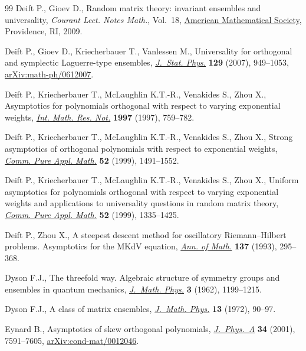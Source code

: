 \documentclass[pdftex]{sigma}
\numberwithin{equation}{section}
\begin{document}
\begin{thebibliography}{99}
Deift P., Gioev D., Random matrix theory: invariant ensembles and universality,
 \textit{Courant Lect. Notes Math.}, Vol.~18, \href{https://doi.org/10.1090/cln/018}{American Mathematical Society},
 Providence, RI, 2009.

Deift P., Gioev D., Kriecherbauer T., Vanlessen M., Universality for orthogonal
 and symplectic {L}aguerre-type ensembles, \href{https://doi.org/10.1007/s10955-007-9325-x}{\textit{J.~Stat. Phys.}}
 \textbf{129} (2007), 949--1053, \href{https://arxiv.org/abs/math-ph/0612007}{arXiv:math-ph/0612007}.

Deift P., Kriecherbauer T., McLaughlin K.T.-R., Venakides S., Zhou X.,
 Asymptotics for polynomials orthogonal with respect to varying exponential
 weights, \href{https://doi.org/10.1155/S1073792897000500}{\textit{Int. Math. Res. Not.}} \textbf{1997} (1997), 759--782.

Deift P., Kriecherbauer T., McLaughlin K.T.-R., Venakides S., Zhou X., Strong
 asymptotics of orthogonal polynomials with respect to exponential weights,
 \href{https://doi.org/10.1002/(SICI)1097-0312(199912)52:12<1491::AID-CPA2>3.3.CO;2-R}{\textit{Comm. Pure Appl. Math.}} \textbf{52} (1999), 1491--1552.

Deift P., Kriecherbauer T., McLaughlin K.T.-R., Venakides S., Zhou X., Uniform
 asymptotics for polynomials orthogonal with respect to varying exponential
 weights and applications to universality questions in random matrix theory,
 \href{https://doi.org/10.1002/(SICI)1097-0312(199911)52:11<1335::AID-CPA1>3.0.CO;2-1}{\textit{Comm. Pure Appl. Math.}} \textbf{52} (1999), 1335--1425.

Deift P., Zhou X., A steepest descent method for oscillatory
 {R}iemann--{H}ilbert problems. {A}symptotics for the {MK}d{V} equation,
 \href{https://doi.org/10.2307/2946540}{\textit{Ann. of Math.}} \textbf{137} (1993), 295--368.

Dyson F.J., The threefold way. {A}lgebraic structure of symmetry groups and
 ensembles in quantum mechanics, \href{https://doi.org/10.1063/1.1703863}{\textit{J.~Math. Phys.}} \textbf{3} (1962),
 1199--1215.

Dyson F.J., A class of matrix ensembles, \href{https://doi.org/10.1063/1.1665857}{\textit{J.~Math. Phys.}} \textbf{13}
 (1972), 90--97.

Eynard B., Asymptotics of skew orthogonal polynomials, \href{https://doi.org/10.1088/0305-4470/34/37/312}{\textit{J.~Phys.~A}}
 \textbf{34} (2001), 7591--7605, \href{https://arxiv.org/abs/cond-mat/0012046}{arXiv:cond-mat/0012046}.


\end{thebibliography}
\end{document}
